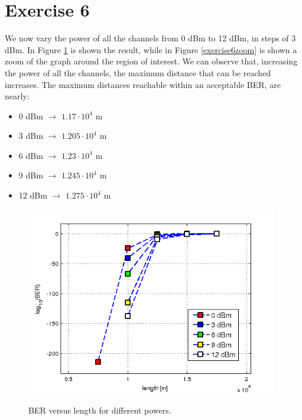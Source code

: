 \documentclass[a4paper,10pt]{report}
\begin{document}
\newpage
\section*{Exercise 6}
We now vary the power of all the channels from 0 dBm to 12 dBm, in steps of 3 dBm.
In Figure \ref{exercise6} is shown the result, while in Figure \ref{exercise6zoom} is shown a zoom of the graph around the region of interest.
We can observe that, increasing the power of all the channels, the maximum distance that can be reached increases.
The maximum distances reachable within an acceptable BER, are nearly:
\begin{itemize}
 \item 0 dBm $\rightarrow$ $1.17 \cdot 10^4$ m
 \item 3 dBm $\rightarrow$ $1.205 \cdot 10^4$ m
 \item 6 dBm $\rightarrow$ $1.23 \cdot 10^4$ m
 \item 9 dBm $\rightarrow$ $1.245 \cdot 10^4$ m
 \item 12 dBm $\rightarrow$ $1.275 \cdot 10^4$ m
\end{itemize}


\begin{figure}[!ht]
   \centering
   \includegraphics[width=11cm]{exercise6.png}\\
   \caption{BER versus length for different powers.}
   \label{exercise6}
\end{figure}
\end{document}
